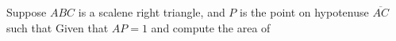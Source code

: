Suppose $ABC$ is a scalene right triangle, and $P$ is the point on hypotenuse $\overline{AC}$ such that   Given that $AP=1$ and  compute the area of 
